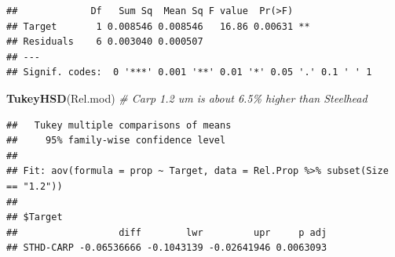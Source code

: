\documentclass[
]{article}
\newenvironment{Shaded}{\begin{snugshade}}{\end{snugshade}}
\newcommand{\CommentTok}[1]{\textcolor[rgb]{0.56,0.35,0.01}{\textit{#1}}}
\newcommand{\FunctionTok}[1]{\textcolor[rgb]{0.13,0.29,0.53}{\textbf{#1}}}
\newcommand{\NormalTok}[1]{#1}
\begin{document}
\begin{verbatim}
##             Df   Sum Sq  Mean Sq F value  Pr(>F)   
## Target       1 0.008546 0.008546   16.86 0.00631 **
## Residuals    6 0.003040 0.000507                   
## ---
## Signif. codes:  0 '***' 0.001 '**' 0.01 '*' 0.05 '.' 0.1 ' ' 1
\end{verbatim}

\begin{Shaded}
\begin{Highlighting}[]
\FunctionTok{TukeyHSD}\NormalTok{(Rel.mod) }\CommentTok{\# Carp 1.2 um is about 6.5\% higher than Steelhead}
\end{Highlighting}
\end{Shaded}

\begin{verbatim}
##   Tukey multiple comparisons of means
##     95% family-wise confidence level
## 
## Fit: aov(formula = prop ~ Target, data = Rel.Prop %>% subset(Size == "1.2"))
## 
## $Target
##                  diff        lwr         upr     p adj
## STHD-CARP -0.06536666 -0.1043139 -0.02641946 0.0063093
\end{verbatim}
\end{document}
